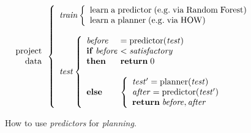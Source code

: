 \documentclass[conference]{IEEEtran}
\begin{document}
  
  
\begin{figure}[!t]
\small 
\[
\begin{array}{r}
\mathrm{project}\\
\mathrm{data}
\end{array} 
\left\{\begin{array}{l}\mathit{train}
        \left\{\begin{array}{l}
                \mathrm{learn\;a\;}\mathrm{predictor\;}\mathrm{(e.g.\;via \;Random\;Forest)}\\
                \mathrm{learn\;a\;}\mathrm{planner\;}\mathrm{(e.g.\;via \; HOW)}
              \end{array}\right.
       \\
      ~\\
\mathit{test}  
    \left\{\begin{array}{l@{~}l}
           \mathit{before}& =\mathrm{predictor}(\mathit{test})\\
           \mathrm{\bf if\;}\mathit{before} & <  \mathit{satisfactory}\\
           \mathrm{\bf then}  & \mathrm{{\bf return}\; 0}\\~\\
           \mathrm{\bf else} &
           \left\{
            \begin{array}{l}
                \mathit{test'} = \mathrm{planner}(\mathit{test})\\
                \mathit{after} =\mathrm{predictor}(\mathit{test'})\\ 
                \mathrm{{\bf return}\;} \mathit{before},\mathit{after}
            \end{array}
          \right.
   \end{array}\right.
\end{array} \right. 
\]
 
\caption{How to use {\em predictors} for {\em planning}.}\label{fig:work}
\end{figure}
\end{document}
